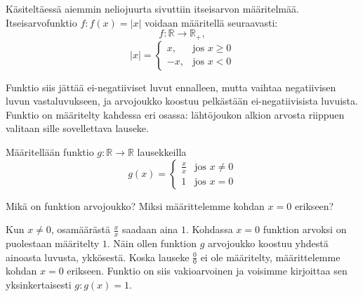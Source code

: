 Käsiteltäessä aiemmin neliojuurta sivuttiin itseisarvon määritelmää. Itseisarvofunktio $f: f(x) = \lvert x \rvert$ voidaan määritellä seuraavasti:
$$f\colon \mathbb{R} \to \mathbb{R}_+,$$
$$ \lvert x \rvert =
				\begin{cases}
                 x, & \text{jos } x \geq 0 \\
                 -x, & \text{jos } x < 0
                \end{cases}
$$

Funktio siis jättää ei-negatiiviset luvut ennalleen, mutta vaihtaa negatiivisen luvun vastaluvukseen, ja arvojoukko koostuu pelkästään ei-negatiivisista luvuista. Funktio on määritelty kahdessa eri osassa: lähtöjoukon alkion arvosta riippuen valitaan sille sovellettava lauseke.

\begin{esimerkki}
Määritellään funktio $g\colon \mathbb{R} \to \mathbb{R}$ lausekkeilla
 $$
 g(x) = \begin{cases}
         \frac{x}{x} & \text{jos } x \neq 0 \\
         1 & \text{jos } x = 0
        \end{cases}
$$
 
Mikä on funktion arvojoukko? Miksi määrittelemme kohdan $x = 0$ erikseen?

\begin{esimratk}
Kun $x \neq 0$, osamäärästä $\frac{x}{x}$ saadaan aina $1$. Kohdassa $x=0$ funktion arvoksi on puolestaan määritelty $1$. Näin ollen funktion $g$ arvojoukko koostuu yhdestä ainoasta luvusta, ykkösestä. Koska lauseke $\frac{0}{0}$ ei ole määritelty, määrittelemme kohdan $x=0$ erikseen. Funktio on siis vakioarvoinen ja voisimme kirjoittaa sen yksinkertaisesti $g\colon g(x) = 1$. 

\end{esimratk}
\end{esimerkki}